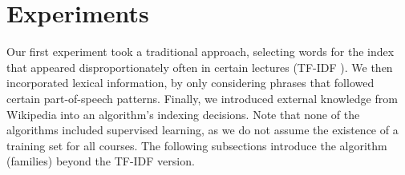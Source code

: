 \section{Experiments}
\label{sec:exp}



Our first experiment took a traditional approach, selecting words for
the index that appeared disproportionately often in certain lectures
(TF-IDF \cite{mann2008}). We then incorporated lexical information, by
only considering phrases that followed certain part-of-speech
patterns. Finally, we introduced external knowledge from Wikipedia
into an algorithm's indexing decisions. Note that none of the
algorithms included supervised learning, as we do not assume the
existence of a training set for all courses. The following subsections
introduce the algorithm (families) beyond the TF-IDF version.





